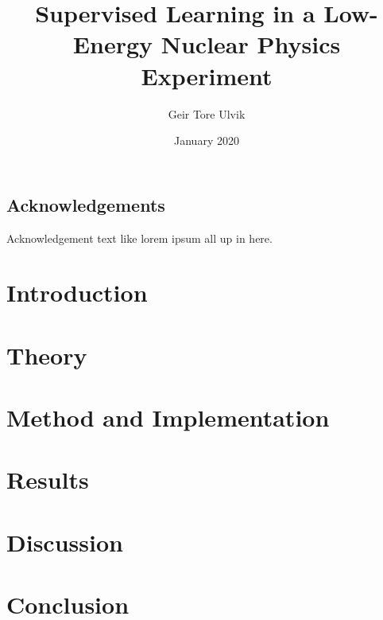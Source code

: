 \documentclass[twoside,english]{uiofysmaster}
\author{Geir Tore Ulvik}
\title{Supervised Learning in a Low-Energy Nuclear Physics Experiment}
\date{January 2020}
\begin{document}
\maketitle

\tableofcontents
\listoffigures

\newpage
\section*{Acknowledgements}
Acknowledgement text like lorem ipsum all up in here.
\newpage



\chapter{Introduction}

\chapter{Theory}

\chapter{Method and Implementation}

\chapter{Results}

\chapter{Discussion}

\chapter{Conclusion}




\end{document}
